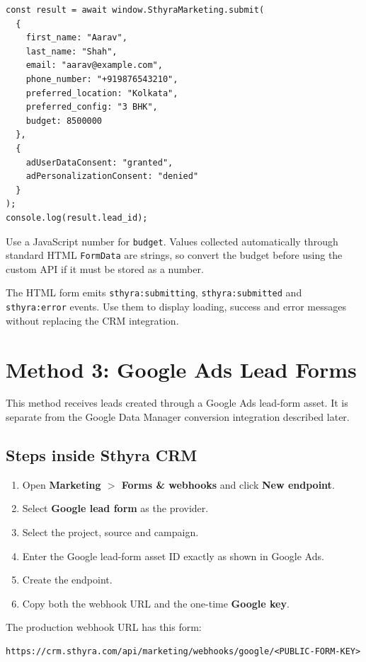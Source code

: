 \documentclass[11pt,a4paper]{article}
\newcommand{\menu}[1]{\textbf{#1}}
\newcommand{\code}[1]{\texttt{#1}}
\begin{document}
\begin{lstlisting}
const result = await window.SthyraMarketing.submit(
  {
    first_name: "Aarav",
    last_name: "Shah",
    email: "aarav@example.com",
    phone_number: "+919876543210",
    preferred_location: "Kolkata",
    preferred_config: "3 BHK",
    budget: 8500000
  },
  {
    adUserDataConsent: "granted",
    adPersonalizationConsent: "denied"
  }
);
console.log(result.lead_id);
\end{lstlisting}

Use a JavaScript number for \code{budget}. Values collected automatically through standard HTML \code{FormData} are strings, so convert the budget before using the custom API if it must be stored as a number.

The HTML form emits \code{sthyra:submitting}, \code{sthyra:submitted} and \code{sthyra:error} events. Use them to display loading, success and error messages without replacing the CRM integration.

\section{Method 3: Google Ads Lead Forms}

This method receives leads created through a Google Ads lead-form asset. It is separate from the Google Data Manager conversion integration described later.

\subsection{Steps inside Sthyra CRM}

\begin{enumerate}
  \item Open \menu{Marketing $>$ Forms \& webhooks} and click \menu{New endpoint}.
  \item Select \menu{Google lead form} as the provider.
  \item Select the project, source and campaign.
  \item Enter the Google lead-form asset ID exactly as shown in Google Ads.
  \item Create the endpoint.
  \item Copy both the webhook URL and the one-time \menu{Google key}.
\end{enumerate}

The production webhook URL has this form:

\begin{lstlisting}
https://crm.sthyra.com/api/marketing/webhooks/google/<PUBLIC-FORM-KEY>
\end{lstlisting}
\end{document}
